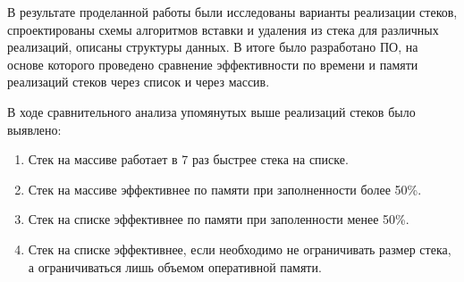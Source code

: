 \Conclusion

В результате проделанной работы были исследованы варианты реализации стеков, спроектированы схемы алгоритмов вставки и удаления из стека для различных реализаций, описаны структуры данных. В итоге было разработано ПО, на основе которого проведено сравнение эффективности по времени и памяти реализаций стеков через список и через массив.

В ходе сравнительного анализа упомянутых выше реализаций стеков было выявлено:
\begin{enumerate}
	\item Стек на массиве работает в 7 раз быстрее стека на списке.
	\item Стек на массиве эффективнее по памяти при заполненности более 50\%.
	\item Стек на списке эффективнее по памяти при заполенности менее 50\%.
	\item Стек на списке эффективнее, если необходимо не ограничивать размер стека, а ограничиваться лишь объемом оперативной памяти.
\end{enumerate}